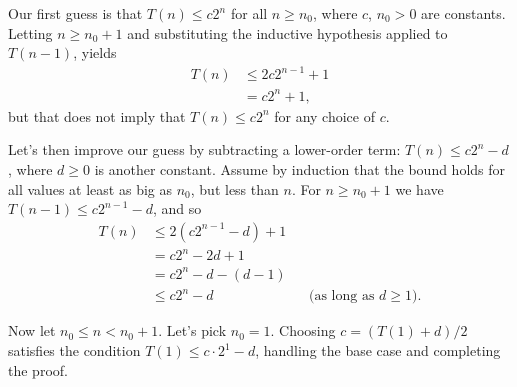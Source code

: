 Our first guess is that $T(n)\le c2^n$ for all $n\ge n_0$, where $c$, $n_0>0$ are constants.
Letting $n\ge n_0+1$ and substituting the inductive hypothesis applied to $T(n-1)$, yields
\begin{align*}
    T(n) &\le 2c2^{n-1}+1 \\
    &= c2^n+1,
\end{align*}
but that does not imply that $T(n)\le c2^n$ for any choice of $c$.

Let's then improve our guess by subtracting a lower-order term: $T(n)\le c2^n-d$, where $d\ge0$ is another constant.
Assume by induction that the bound holds for all values at least as big as $n_0$, but less than $n$.
For $n\ge n_0+1$ we have $T(n-1)\le c2^{n-1}-d$, and so
\begin{align*}
    T(n) &\le 2(c2^{n-1}-d)+1 \\
    &= c2^n-2d+1 \\
    &= c2^n-d-(d-1) \\
    &\le c2^n-d && \text{(as long as $d\ge1$)}.
\end{align*}

Now let $n_0\le n<n_0+1$.
Let's pick $n_0=1$.
Choosing $c=(T(1)+d)/2$ satisfies the condition $T(1)\le c\cdot2^1-d$, handling the base case and completing the proof.

